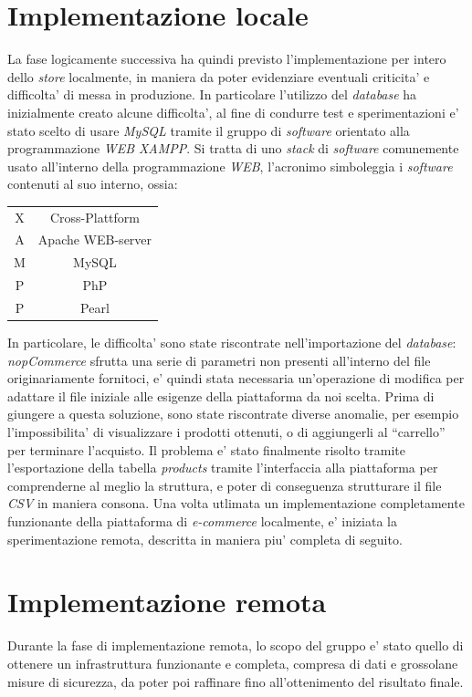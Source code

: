 \documentclass[a4paper]{report}
\newcommand{\quotes}[1]{``#1''}
\begin{document}
	\section{Implementazione locale}\label{implementazione_locale}
		La fase logicamente successiva ha quindi previsto l'implementazione per intero dello \emph{store} localmente,
		in maniera da poter evidenziare eventuali criticita' e difficolta' di messa in produzione. In particolare
		l'utilizzo del \emph{database} ha inizialmente creato alcune difficolta', al fine di condurre test e
		sperimentazioni e' stato scelto di usare \emph{MySQL} tramite il gruppo di \emph{software} orientato alla
		programmazione \emph{WEB} \emph{XAMPP}. Si tratta di uno \emph{stack} di \emph{software} comunemente usato
		all'interno della programmazione \emph{WEB}, l'acronimo simboleggia i \emph{software} contenuti al suo interno,
		ossia:
		\begin{center}
			\begin{tabular}{c c}
				X & Cross-Plattform \\
				A & Apache WEB-server \\
				M & MySQL \\
				P & PhP \\
				P & Pearl \\
			\end{tabular}
		\end{center}
		In particolare, le difficolta' sono state riscontrate nell'importazione del \emph{database}: \emph{nopCommerce}
		sfrutta una serie di parametri non presenti all'interno del file originariamente fornitoci, e' quindi stata
		necessaria un'operazione di modifica per adattare il file iniziale alle esigenze della piattaforma da noi
		scelta.
		Prima di giungere a questa soluzione, sono state riscontrate diverse anomalie, per esempio l'impossibilita' di
		visualizzare i prodotti ottenuti, o di aggiungerli al \quotes{carrello} per terminare l'acquisto.
		Il problema e' stato finalmente risolto tramite l'esportazione della tabella \emph{products} tramite
		l'interfaccia alla piattaforma per comprenderne al meglio la struttura, e poter di conseguenza strutturare il
		file \emph{CSV} in maniera consona.
		Una volta utlimata un implementazione completamente funzionante della piattaforma di \emph{e-commerce}
		localmente, e' iniziata la sperimentazione remota, descritta in maniera piu' completa di seguito.
	 \section{Implementazione remota}\label{implementazione_remota}
		Durante la fase di implementazione remota, lo scopo del gruppo e' stato quello di ottenere un infrastruttura
		funzionante e completa, compresa di dati e grossolane misure di sicurezza, da poter poi raffinare fino
		all'ottenimento del risultato finale.
\end{document}
